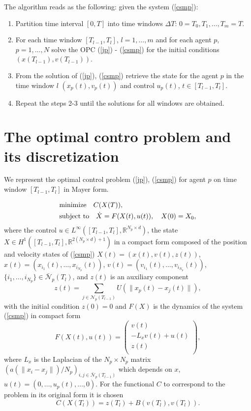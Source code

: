 \documentclass[a4paper,10pt, english]{article}
\newcommand{\D}{\displaystyle}
\begin{document}
   The algorithm reads as the following: given the system (\ref{csmp}):
   \begin{enumerate}
   \item Partition time interval $[0, T]$ into time windows $\Delta T$: $0 = T_0, T_1, \dots, T_m = T$.
   \item For each time window  $[T_{l-1}, T_{l}]$, $l = 1, \dots, m$ and for each agent $p$, $p = 1, \dots, N$  solve the OPC (\ref{jp}) - (\ref{csmp}) for the initial conditions $(x(T_{l-1}), v(T_{l-1}))$.
   \item From the solution of (\ref{jp}), (\ref{csmp})  retrieve the  state for the agent $p$ in the time window $l$ $(x_p(t), v_p(t))$ and control $u_p(t)$, $t\in [T_{l-1}, T_{l}]$.
   \item Repeat the steps 2-3 until the solutions for all windows are obtained. 
 \end{enumerate}
 



 
 
 \section{The optimal contro problem and its discretization}
  We represent the optimal control problem  (\ref{jp}), (\ref{csmp}) for agent $p$ on time window $[T_{l-1}, T_{l}]$ in Mayer form.
  
 \begin{align}
 \D
 & \mbox{minimize}\quad  C(X(T)),   \label{compact_cost} \\ 
 & \mbox{subject to} \quad \dot{X} = F(X(t), u(t)), \quad X(0) = X_0, \label{compact_equation}
 \end{align}
where  the control $u \in  L^{\infty}([T_{l-1}, T_{l}], \mathbb{R}^{N_p \times d})$,
the state $X\in H^1([T_{l-1}, T_{l}], \mathbb{R}^{2(N_p \times d)+1})$
in a compact form composed of the position and velocity 
states of (\ref{csmp})   $X(t) = (x(t), v(t), z(t))$, $x(t) = (x_{i_1}(t), \dots, x_{i_{N_p}}(t))$,
 $v(t) = (v_{i_1}(t), \dots, v_{i_{N_p}}(t))$, $\{i_1, \dots, i_{N_p}\} \in \bar{\mathcal{N}}_p(T_l)$, 
 and $z(t)$ is an auxiliary component 
 $$
 z(t) =  \sum_{j\in \mathcal{N}_p(T_{l-1})} U(\|x_p(t) - x_j(t)\|),
 $$
 with the initial condition $z(0) = 0$ and $F(X)$ is the dynamics of the system (\ref{csmp}) in compact form
 $$
 F(X(t), u(t)) =
  \left( 
  \begin{array}{c}
  v(t)\\
   - L_xv(t) + u(t)\\
   z(t)\\
 \end{array} 
 \right), 
 $$
 where $L_x$ is the Laplacian of the $N_p\times N_p$ matrix $(a(\|x_i - x_j\|)/N_p)_{i, j\in\bar{\mathcal{N}}_p(T_{l-1})}$ which depends on $x$, $u(t) = (0, \dots, u_p(t), \dots, 0)$.
 For the functional $C$ to correspond to the problem in its original form it is chosen 
 $$
 C(X(T_l)) = z(T_l) + B(v(T_l), v(T_l)).
 $$
 
\end{document}
